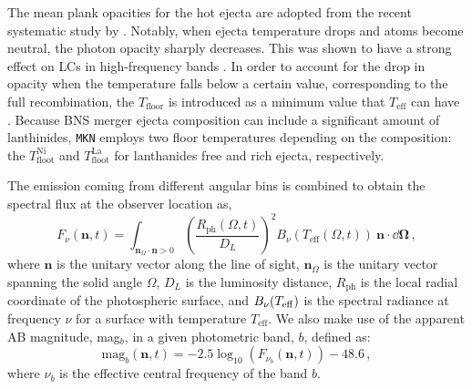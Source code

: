 %
The mean plank opacities for the hot ejecta are adopted from the recent systematic study by \citet{Tanaka:2019iqp}.
Notably, when ejecta  temperature drops and atoms become neutral, 
the photon opacity sharply decreases. 
This was shown to have a strong effect on \acp{LC} in high-frequency bands 
\citep{Villar:2017oya}. In order to account 
for the drop in opacity when the temperature falls below a certain value,
corresponding to the full 
recombination, the $T_{\text{floor}}$ is introduced  
as a minimum value that $T_{\text{eff}}$ can have \citep{Kasen:2017sxr,Kasen:2018drm}. 
Because \ac{BNS} merger ejecta composition can include a significant amount of lanthinides, 
\texttt{MKN} employs two floor temperatures 
depending on the composition: the $T_{\text{floot}}^{\text{Ni}}$ and 
$T_{\text{floot}}^{\text{La}}$ for lanthanides free and rich ejecta, respectively.



The emission coming from different angular bins is combined to obtain the 
spectral flux at the observer location as, 
%
\begin{equation}
\label{eq:spectral_flux}
F_{\nu}(\mathbf{n},t) = \int_{\mathbf{n}_{\Omega} \cdot \mathbf{n}> 0} 
\left( \frac{R_{\text{ph}}(\Omega,t)}{D_L} \right)^2  B_{\nu}(T_{\text{eff}}(\Omega,t))~\mathbf{n} \cdot  \dd\boldsymbol{\Omega}\, , 
\end{equation}
%
where $\mathbf{n}$ is the unitary vector along the line of sight, 
$\mathbf{n}_{\Omega}$ is the unitary vector spanning the solid angle 
$\Omega$, $D_L$ is the luminosity distance, $R_{\text{ph}}$ is the local 
radial coordinate of the photospheric surface, and $B_{\nu}(T_{\rm eff})$ 
is the spectral radiance at frequency $\nu$ for a surface with temperature $T_{\text{eff}}$. 
%
We also make use of the apparent AB magnitude, mag$_b$, 
in a given photometric band, $b$, defined as:
%
\begin{equation}
\label{eq:mag}
\text{mag}_b(\mathbf{n},t) = -2.5 \log_{10}\left( F_{\nu_b}(\mathbf{n},t) \right)-48.6\,,
\end{equation}
where $\nu_b$ is the effective central frequency of the band $b$.

